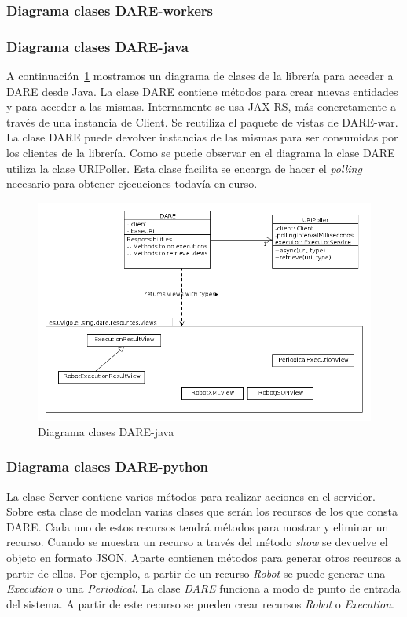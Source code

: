 \subsubsection{Diagrama clases DARE-workers}

\subsubsection{Diagrama clases DARE-java}
A continuación~\ref{diagrama_clases_dare_java} mostramos un diagrama
de clases de la librería para acceder a DARE desde Java. La clase DARE
contiene métodos para crear nuevas entidades y para acceder a las
mismas. Internamente se usa JAX-RS, más concretamente a través de una
instancia de Client. Se reutiliza el paquete de vistas de DARE-war. La
clase DARE puede devolver instancias de las mismas para ser consumidas
por los clientes de la librería. Como se puede observar en el diagrama
la clase DARE utiliza la clase URIPoller. Esta clase facilita se
encarga de hacer el \emph{polling} necesario para obtener ejecuciones
todavía en curso.

\begin{figure}[hp]
\includegraphics[width=\textwidth]{chapters/technical-manual/diagrams/clases_dare_java.png}
\caption{Diagrama clases DARE-java}\label{diagrama_clases_dare_java}
\end{figure}

\subsubsection{Diagrama clases DARE-python}

La clase Server contiene varios métodos para realizar acciones en el
servidor. Sobre esta clase de modelan varias clases que serán los
recursos de los que consta DARE. Cada uno de estos recursos tendrá
métodos para mostrar y eliminar un recurso. Cuando se muestra un
recurso a través del método \emph{show} se devuelve el objeto en
formato JSON. Aparte contienen métodos para generar otros recursos a
partir de ellos. Por ejemplo, a partir de un recurso \emph{Robot} se
puede generar una \emph{Execution} o una \emph{Periodical}. La clase
\emph{DARE} funciona a modo de punto de entrada del sistema. A partir
de este recurso se pueden crear recursos \emph{Robot} o
\emph{Execution}.

